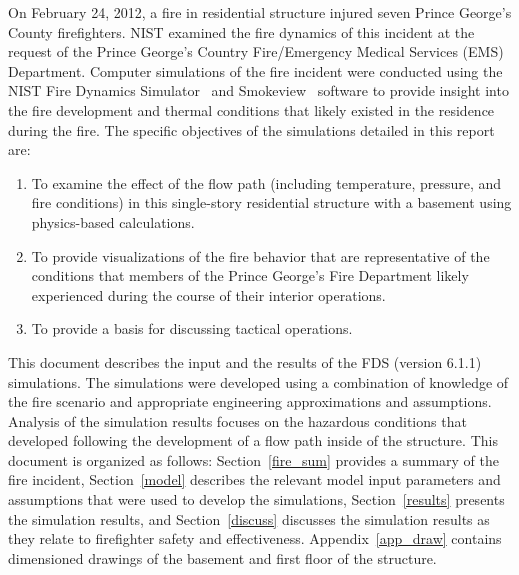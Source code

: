 \documentclass[12pt,oneside]{book}
\begin{document}
On February 24, 2012, a fire in residential structure injured seven Prince George's County firefighters. NIST examined the fire dynamics of this incident at the request of the Prince George's Country Fire/Emergency Medical Services (EMS) Department. Computer simulations of the fire incident were conducted using the NIST Fire Dynamics Simulator~\cite{FDS_Users_Guide} and Smokeview~\cite{Smokeview_Users_Guide} software to provide insight into the fire development and thermal conditions that likely existed in the residence during the fire. The specific objectives of the simulations detailed in this report are: 
\begin{enumerate}
\item To examine the effect of the flow path (including temperature, pressure, and fire conditions) in this single-story residential structure with a basement using physics-based calculations.
\item To provide visualizations of the fire behavior that are representative of the conditions that members of the Prince George's Fire Department likely experienced during the course of their interior operations.
\item To provide a basis for discussing tactical operations.
\end{enumerate}

This document describes the input and the results of the FDS (version 6.1.1) simulations. The simulations were developed using a combination of knowledge of the fire scenario and appropriate engineering approximations and assumptions. Analysis of the simulation results focuses on the hazardous conditions that developed following the development of a flow path inside of the structure. This document is organized as follows: Section~\ref{fire_sum} provides a summary of the fire incident, Section~\ref{model} describes the relevant model input parameters and assumptions that were used to develop the simulations, Section~\ref{results} presents the simulation results, and Section~\ref{discuss} discusses the simulation results as they relate to firefighter safety and effectiveness. Appendix~\ref{app_draw} contains dimensioned drawings of the basement and first floor of the structure.
\end{document}
